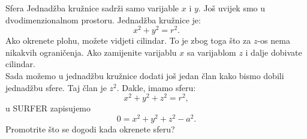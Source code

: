 \begin{surferPage}[Sphere]{Sfera}
Jednad\v zba kru\v znice sadr\v zi samo varijable $x$ i $y$. Jo\v s uvijek smo u dvodimenzionalnom prostoru.
Jednad\v zba kru\v znice je:
\[x^2+y^2=r^2.\]
Ako okrenete plohu, mo\v zete vidjeti cilindar. To je zbog toga \v sto za $z$-os nema nikakvih ograni\v cenja. Ako zamijenite varijablu $x$ sa varijablom $z$ i dalje dobivate cilindar.\\
Sada mo\v zemo u jednad\v zbu kru\v znice dodati jo\v s jedan \v clan kako bismo dobili jednad\v zbu sfere. Taj \v clan je $z^2$. Dakle, imamo sferu:
\[x^2+y^2+z^2=r^2,\]
u SURFER zapisujemo
\[0=x^2+y^2+z^2-a^2.\]
Promotrite \v sto se dogodi kada okrenete sferu?
\end{surferPage}
